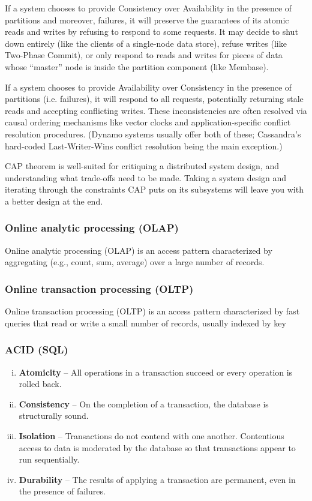 \documentclass{article}
\begin{document}
    If a system chooses to provide Consistency over Availability in the presence of partitions and moreover, failures, it will preserve the guarantees of its atomic reads and writes by refusing to respond to some requests. It may decide to shut down entirely (like the clients of a single-node data store), refuse writes (like Two-Phase Commit), or only respond to reads and writes for pieces of data whose ``master” node is inside the partition component (like Membase).
    
    If a system chooses to provide Availability over Consistency in the presence of partitions (i.e. failures), it will respond to all requests, potentially returning stale reads and accepting conflicting writes. These inconsistencies are often resolved via causal ordering mechanisms like vector clocks and application-specific conflict resolution procedures. (Dynamo systems usually offer both of these; Cassandra’s hard-coded Last-Writer-Wins conflict resolution being the main exception.)
    
    CAP theorem is well-suited for critiquing a distributed system design, and understanding what trade-offs need to be made. Taking a system design and iterating through the constraints CAP puts on its subsystems will leave you with a better design at the end. 
    
    \subsubsection{Online analytic processing (OLAP)}
    Online analytic processing (OLAP) is an access pattern characterized by aggregating (e.g., count, sum, average) over a large number of records.

    \subsubsection{Online transaction processing (OLTP)}
    Online transaction processing (OLTP) is an access pattern characterized by fast queries that read or write a small number of records, usually indexed by key
    
    \subsubsection{ACID (SQL)}
    \begin{enumerate}[i.]
        \item \textbf{Atomicity} -- All operations in a transaction succeed or every operation is rolled back.
        \item \textbf{Consistency} -- On the completion of a transaction, the database is structurally sound.
        \item \textbf{Isolation} -- Transactions do not contend with one another. Contentious access to data is moderated by the database so that transactions appear to run sequentially.
        \item \textbf{Durability} -- The results of applying a transaction are permanent, even in the presence of failures.
    \end{enumerate}
    
\end{document}
